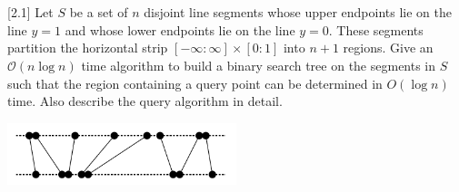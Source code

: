 \documentclass[11pt]{article}
\newenvironment{Quest}{ \begin{framed}} {\end{framed}  \vspace{0.2 cm}}
\begin{document}

\section{}

\begin{Quest}

[2.1] Let $S$ be a set of $n$ disjoint line segments whose upper endpoints lie on the line $y=1$ and whose lower endpoints lie on the line $y=0$. These segments partition the horizontal strip $[- \infty : \infty]\times[0 : 1]$ into $n+1$ regions. Give an $\mathcal{O}(n \log n)$ time algorithm to build a binary search tree on the segments in $S$ such that the region containing a query point can be determined in $O(\log n)$ time. Also describe the query algorithm in detail.

\includegraphics[width=0.5\textwidth]{exercise2}

\end{Quest}
\end{document}
